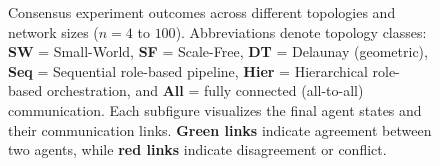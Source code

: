 \begin{figure}[t]
   


    
    \caption{Consensus experiment outcomes across different topologies and network sizes ($n=4$ to $100$).
Abbreviations denote topology classes: \textbf{SW} = Small-World, \textbf{SF} = Scale-Free, \textbf{DT} = Delaunay (geometric),
\textbf{Seq} = Sequential role-based pipeline, \textbf{Hier} = Hierarchical role-based orchestration, and
\textbf{All} = fully connected (all-to-all) communication.
Each subfigure visualizes the final agent states and their communication links.
\textbf{Green links} indicate agreement between two agents, while \textbf{red links} indicate disagreement or conflict.}
\label{fig:consensus-results}
\vspace{-4mm}
\end{figure}
